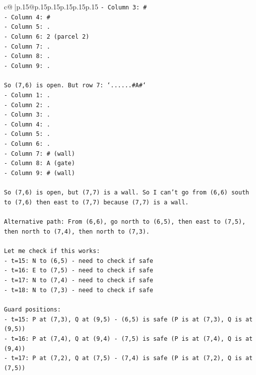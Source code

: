 \documentclass{article}
\begin{document}
{\begin{supertabular}{c@{$\;$}|p{.15\linewidth}@{}p{.15\linewidth}p{.15\linewidth}p{.15\linewidth}p{.15\linewidth}p{.15\linewidth}}
{{{\texttt{{-} Column 3: \#} \\
\texttt{{-} Column 4: \#} \\
\texttt{{-} Column 5: .} \\
\texttt{{-} Column 6: 2 (parcel 2)} \\
\texttt{{-} Column 7: .} \\
\texttt{{-} Column 8: .} \\
\texttt{{-} Column 9: .} \\
\\ 
\texttt{So (7,6) is open. But row 7: `......\#A\#`} \\
\texttt{{-} Column 1: .} \\
\texttt{{-} Column 2: .} \\
\texttt{{-} Column 3: .} \\
\texttt{{-} Column 4: .} \\
\texttt{{-} Column 5: .} \\
\texttt{{-} Column 6: .} \\
\texttt{{-} Column 7: \# (wall)} \\
\texttt{{-} Column 8: A (gate)} \\
\texttt{{-} Column 9: \# (wall)} \\
\\ 
\texttt{So (7,6) is open, but (7,7) is a wall. So I can't go from (6,6) south to (7,6) then east to (7,7) because (7,7) is a wall.} \\
\\ 
\texttt{Alternative path: From (6,6), go north to (6,5), then east to (7,5), then north to (7,4), then north to (7,3).} \\
\\ 
\texttt{Let me check if this works:} \\
\texttt{{-} t=15: N to (6,5) {-} need to check if safe} \\
\texttt{{-} t=16: E to (7,5) {-} need to check if safe} \\
\texttt{{-} t=17: N to (7,4) {-} need to check if safe} \\
\texttt{{-} t=18: N to (7,3) {-} need to check if safe} \\
\\ 
\texttt{Guard positions:} \\
\texttt{{-} t=15: P at (7,3), Q at (9,5) {-} (6,5) is safe (P is at (7,3), Q is at (9,5))} \\
\texttt{{-} t=16: P at (7,4), Q at (9,4) {-} (7,5) is safe (P is at (7,4), Q is at (9,4))} \\
\texttt{{-} t=17: P at (7,2), Q at (7,5) {-} (7,4) is safe (P is at (7,2), Q is at (7,5))} \\
}}}
\end{supertabular}}
\end{document}
